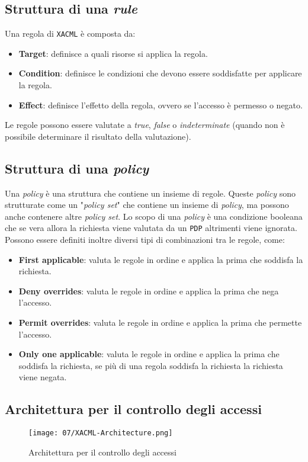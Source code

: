     \subsection{Struttura di una \textit{rule}}
        Una regola di \texttt{XACML} è composta da:
        \begin{itemize}
            \item \textbf{Target}: definisce a quali risorse si applica la regola.
            \item \textbf{Condition}: definisce le condizioni che devono essere soddisfatte per applicare la regola.
            \item \textbf{Effect}: definisce l'effetto della regola, ovvero se l'accesso è permesso o negato.
        \end{itemize}
        Le regole possono essere valutate a \textit{true}, \textit{false} o \textit{indeterminate} (quando non è possibile determinare il risultato della valutazione).
    \subsection{Struttura di una \textit{policy}}
        Una \textit{policy} è una struttura che contiene un insieme di regole. Queste \textit{policy} sono strutturate come un "\textit{policy set}" che contiene un insieme di \textit{policy}, ma possono anche contenere altre \textit{policy set}. Lo scopo di una \textit{policy} è una condizione booleana che se vera allora la richiesta viene valutata da un \texttt{PDP} altrimenti viene ignorata.\newline
        Possono essere definiti inoltre diversi tipi di combinazioni tra le regole, come:
        \begin{itemize}
            \item \textbf{First applicable}: valuta le regole in ordine e applica la prima che soddisfa la richiesta.
            \item \textbf{Deny overrides}: valuta le regole in ordine e applica la prima che nega l'accesso.
            \item \textbf{Permit overrides}: valuta le regole in ordine e applica la prima che permette l'accesso.
            \item \textbf{Only one applicable}: valuta le regole in ordine e applica la prima che soddisfa la richiesta, se più di una regola soddisfa la richiesta la richiesta viene negata.
        \end{itemize}
    \subsection{Architettura per il controllo degli accessi}
        \begin{figure}[H]
            \centering
            \texttt{[image: 07/XACML-Architecture.png]}
            \caption{Architettura per il controllo degli accessi}
        \end{figure}
        
